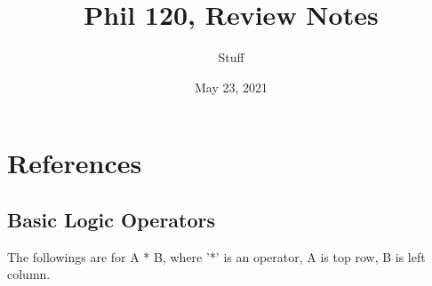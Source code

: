 \documentclass{article}
\title{Phil 120, Review Notes}
\author{Stuff}
\date{May 23, 2021}
\begin{document}
\maketitle
\newpage
\tableofcontents{}

\newpage    

\newcommand{\true}{{\mathfrak{t}}}
\newcommand{\false}{{\mathfrak{f}}}
\newcommand{\greencell}{\cellcolor{green!45}T}
\newcommand{\redcell}{\cellcolor{red!45}F}
\newcommand{\orangecell}{\cellcolor{orange!45}B}
\newcommand{\E}{\mathbb{E}}
\section{References}

\subsection{Basic Logic Operators}
The followings are for A * B, where '*' is an operator, A is top row, B is left column.
\end{document}
